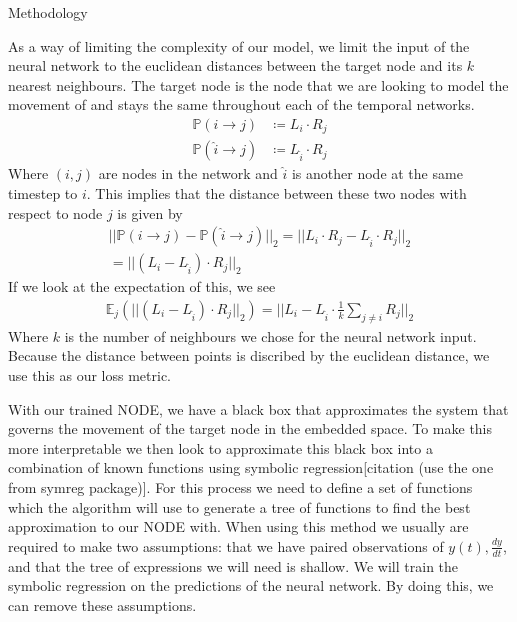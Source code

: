 \documentclass{article}
\begin{document}
\begin{section}{Methodology}
    
    As a way of limiting the complexity of our model, we limit the input of the neural network to the euclidean distances between the target node and its $k$ nearest neighbours. The target node is the node that we are looking to model the movement of and stays the same throughout each of the temporal networks. 
    \begin{align}
        \mathbb{P}(i\rightarrow j)&\coloneqq L_i \cdot R_j\\
        \mathbb{P}(\hat{i}\rightarrow j)&\coloneqq L_{\hat{i}} \cdot R_j
    \end{align}
    Where $(i,j)$ are nodes in the network and $\hat{i}$ is another node at the same timestep to $i$. This implies that the distance between these two nodes with respect to node $j$ is given by
    \begin{equation}
        \begin{gathered}
            ||\mathbb{P}(i\rightarrow j)-\mathbb{P}(\hat{i}\rightarrow j)||_2 = 
            ||L_i \cdot R_j-L_{\hat{i}} \cdot R_j||_2\\
            =||(L_i -L_{\hat{i}}) \cdot R_j||_2
        \end{gathered}
    \end{equation}
    If we look at the expectation of this, we see
    \begin{equation}
        \begin{gathered}
            \mathbb{E}_j(||(L_i -L_{\hat{i}}) \cdot R_j||_2) = ||L_i -L_{\hat{i}} \cdot \frac{1}{k}\sum_{j\ne i}R_j||_2
        \end{gathered}
    \end{equation}
    Where $k$ is the number of neighbours we chose for the neural network input. Because the distance between points is discribed by the euclidean distance, we use this as our loss metric.

    With our trained NODE, we have a black box that approximates the system that governs the movement of the target node in the embedded space. To make this more interpretable we then look to approximate this black box into a combination of known functions using symbolic regression[citation (use the one from symreg package)]. For this process we need to define a set of functions which the algorithm will use to generate a tree of functions to find the best approximation to our NODE with. When using this method we usually are required to make two assumptions: that we have paired observations of $y(t), \frac{dy}{dt}$, and that the tree of expressions we will need is shallow. We will train the symbolic regression on the predictions of the neural network. By doing this, we can remove these assumptions\cite{kidger2022neural}.
\end{section}
\end{document}
